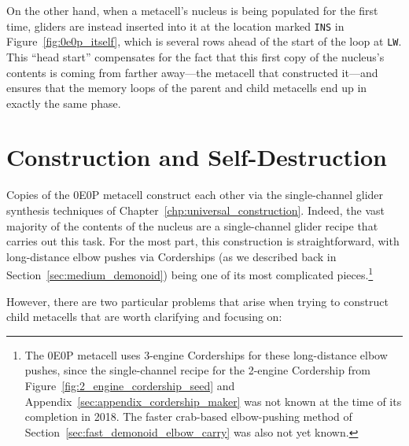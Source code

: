 On the other hand, when a metacell's nucleus is being populated for the first time, gliders are instead inserted into it at the location marked \texttt{INS} in Figure~\ref{fig:0e0p_itself}, which is several rows ahead of the start of the loop at \texttt{LW}. This ``head start'' compensates for the fact that this first copy of the nucleus's contents is coming from farther away---the metacell that constructed it---and ensures that the memory loops of the parent and child metacells end up in exactly the same phase.


\section{Construction and Self-Destruction}\label{sec:0e0p_construction}

Copies of the 0E0P metacell construct each other via the single-channel glider synthesis techniques of Chapter~\ref{chp:universal_construction}. Indeed, the vast majority of the contents of the nucleus are a single-channel glider recipe that carries out this task. For the most part, this construction is straightforward, with long-distance elbow pushes via Corderships (as we described back in Section~\ref{sec:medium_demonoid}) being one of its most complicated pieces.\footnote{The 0E0P metacell uses 3-engine Corderships for these long-distance elbow pushes, since the single-channel recipe for the 2-engine Cordership from Figure~\ref{fig:2_engine_cordership_seed} and Appendix~\ref{sec:appendix_cordership_maker} was not known at the time of its completion in 2018. The faster crab-based elbow-pushing method of Section~\ref{sec:fast_demonoid_elbow_carry} was also not yet known.}

However, there are two particular problems that arise when trying to construct child metacells that are worth clarifying and focusing on:\smallskip

